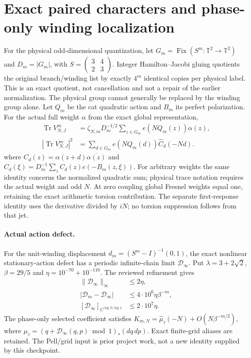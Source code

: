 \section{Exact paired characters and phase-only winding localization}
For the physical odd-dimensional quantization, let
$G_m=\operatorname{Fix}(S^m\!:\mathbb T^2\to\mathbb T^2)$ and
$D_m=|G_m|$, with $S=\left(\begin{smallmatrix}3&4\\2&3\end{smallmatrix}\right)$.
Integer Hamilton--Jacobi gluing quotients the original branch/winding list
by exactly $4^m$ identical copies per physical label. This is an exact
quotient, not cancellation and not a repair of the earlier normalization.
The physical group cannot generally be replaced by the winding group alone.
Let $Q_m$ be the cat quadratic action and $B_m$ its perfect polarization.
For the actual full weight $\alpha$ from the exact global representation,
\[
 \begin{aligned}
 \operatorname{Tr}V_{N,J}^m
 &=\zeta_{N,m}D_m^{-1/2}\sum_{z\in G_m}e(NQ_m(z))\alpha(z),\\
 |\operatorname{Tr}V_{N,J}^m|^2
 &=\sum_{d\in G_m}e(NQ_m(d))\widehat C_d(-Nd).
 \end{aligned}
\]
where $C_d(z)=\alpha(z+d)\overline{\alpha(z)}$ and
$\widehat C_d(\xi)=D_m^{-1}\sum_zC_d(z)e(-B_m(z,\xi))$.
For arbitrary weights the same identity concerns the normalized quadratic
sum; physical trace notation requires the actual weight and odd $N$.
At zero coupling global Fresnel weights equal one, retaining the exact
arithmetic torsion contribution. The separate first-response identity uses
the derivative divided by $iN$; no torsion suppression follows from that jet.

\paragraph{Actual action defect.}
For the unit-winding displacement $d_m=(S^m-I)^{-1}(0,1)$, the exact nonlinear
stationary-action defect has a periodic infinite-chain limit $\mathcal D_\infty$.
Put $\lambda=3+2\sqrt2$, $\beta=29/5$ and
$\eta=10^{-70}+10^{-110}$. The reviewed refinement gives
\[
 \begin{aligned}
 \|\mathcal D_\infty\|_\infty&\le2\eta,\\
 |\mathcal D_m-\mathcal D_\infty|&\le4\cdot10^6\eta\beta^{-m},\\
 [\mathcal D_\infty]_{C^{\log\beta/\log\lambda}}&\le2\cdot10^7\eta.
 \end{aligned}
\]
The phase-only selected coefficient satisfies
$K_{m,N}=\widehat\mu_\tau(-N)+O(N\beta^{-m/2})$, where
$\mu_\tau=(q+\mathcal D_\infty(q,p)\bmod1)_*(dq\,dp)$.
Exact finite-grid aliases are retained. The Pell/grid input is prior project
work, not a new identity supplied by this checkpoint.


